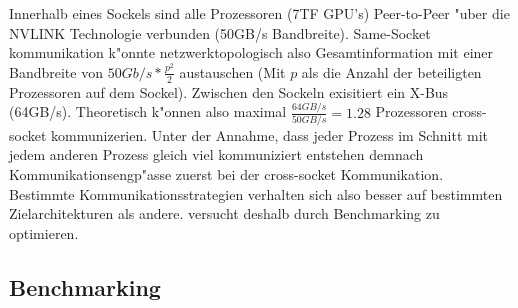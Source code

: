 Innerhalb eines Sockels sind alle Prozessoren (7TF GPU's) Peer-to-Peer "uber die NVLINK Technologie verbunden (50GB/s Bandbreite). Same-Socket kommunikation k"onnte netzwerktopologisch also Gesamtinformation mit einer Bandbreite von $50Gb/s * \frac{p^2}{2}$ austauschen (Mit $p$ als die Anzahl der beteiligten Prozessoren auf dem Sockel).
Zwischen den Sockeln exisitiert ein X-Bus (64GB/s).
Theoretisch k"onnen also maximal $\frac{64GB/s}{50GB/s} = 1.28$ Prozessoren cross-socket kommunizerien. Unter der Annahme, dass jeder Prozess im Schnitt mit jedem anderen Prozess gleich viel kommuniziert  entstehen demnach Kommunikationsengp"asse zuerst bei der cross-socket Kommunikation.\\
Bestimmte Kommunikationsstrategien verhalten sich also besser auf bestimmten Zielarchitekturen als andere.
\cite{mainpaper} versucht deshalb durch Benchmarking zu optimieren. 

\subsection{Benchmarking}
